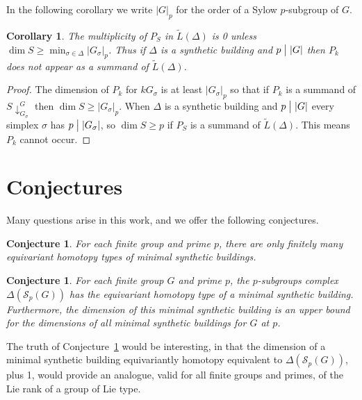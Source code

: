 \documentclass[12pt]{amsart}
\theoremstyle{plain}
\newtheorem{corollary}[theorem]{Corollary}
\newtheorem{conjecture}[theorem]{Conjecture}
\theoremstyle{definition}
\theoremstyle{remark}
\numberwithin{equation}{section}
\newcommand{\SpCpx}[2]{\Delta(\mathcal{S}_{#2}(#1))}
\begin{document}
In the following corollary we write $|G|_p$ for the order of a Sylow $p$-subgroup of $G$.

\begin{corollary}
    The multiplicity of $P_S$ in $\tilde L(\Delta)$ is 0 unless $\dim S \ge \min_{\sigma\in\Delta}|G_\sigma|_p$. Thus if $\Delta$ is a synthetic building and $p\bigm| |G|$ then $P_k$ does not appear as a summand of  $\tilde L(\Delta)$.
\end{corollary}

\begin{proof}
    The dimension of $P_k$ for $kG_\sigma$ is at least $|G_\sigma|_p$ so that if $P_k$ is a summand of $S\downarrow_{G_\sigma}^G$ then $\dim S \ge |G_\sigma|_p$. When $\Delta$ is a synthetic building and $p\bigm| |G|$ every simplex $\sigma$ has 
    $p\bigm| |G_\sigma|$, so $\dim S \ge p$ if $P_S$ is a summand of $\tilde L(\Delta)$. This means $P_k$ cannot occur.
\end{proof}


\section{Conjectures}
\label{conjectures-section}
Many questions arise in this work, and we offer the following conjectures.

\begin{conjecture}
\label{finiteness-conjecture}
    For each finite group and prime $p$, there are only finitely many equivariant homotopy types of minimal synthetic buildings.
\end{conjecture}

\begin{conjecture}
\label{p-subgroups-complex-minimal-conjecture}
    For each finite group $G$ and prime $p$, the $p$-subgroups complex $\SpCpx{G}{p}$ has the equivariant homotopy type of a minimal synthetic building. Furthermore, the dimension of this minimal synthetic building is an upper bound for the dimensions of all minimal synthetic buildings for $G$ at $p$.
\end{conjecture}

The truth of Conjecture~\ref{p-subgroups-complex-minimal-conjecture} would be interesting, in that the dimension of a minimal synthetic building equivariantly homotopy equivalent to $\SpCpx{G}{p}$, plus 1, would provide an analogue, valid for all finite groups and primes, of the Lie rank of a group of Lie type.
\end{document}
